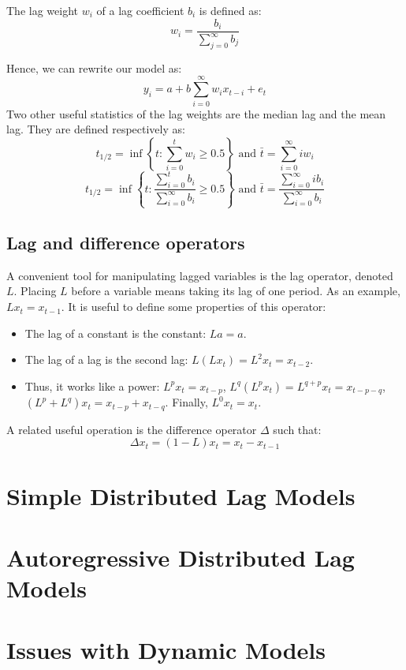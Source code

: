 \begin{definition}
The lag weight $w_i$ of a lag coefficient $b_i$ is defined as: $$w_i = \frac{b_i}{\sum_{j=0}^{\infty} b_j} $$
\end{definition}

Hence, we can rewrite our model as: $$y_i = a + b\sum_{i=0}^{\infty} w_i x_{t-i} + e_t $$ Two other useful statistics of the lag weights are the median lag and the mean lag. They are defined respectively as: $$t_{1/2} = \inf \left\lbrace t : \sum_{i=0}^{t} w_i \geq 0.5\right\rbrace \text{ and } \bar t = \sum_{i=0}^{\infty} iw_i $$ $$t_{1/2} = \inf \left\lbrace t : \frac{\sum_{i=0}^{t} b_i}{\sum_{i=0}^{\infty} b_i}  \geq 0.5\right\rbrace \text{ and } \bar t = \frac{\sum_{i=0}^{\infty} ib_i}{\sum_{i=0}^{\infty} b_i} $$ 

\subsection{Lag and difference operators}

A convenient tool for manipulating lagged variables is the lag operator, denoted $L$. Placing $L$ before a variable means taking its lag of one period. As an example, $Lx_t = x_{t-1}$. It is useful to define some properties of this operator:\begin{itemize}
\item The lag of a constant is the constant: $La = a$.
\item The lag of a lag is the second lag: $L(Lx_t) = L^2 x_t = x_{t-2}$.
\item Thus, it works like a power: $L^px_t = x_{t-p}$, $L^q(L^px_t) = L^{q+p}x_t = x_{t-p-q}$, $(L^p + L^q)x_t = x_{t-p} + x_{t-q}$. Finally, $L^0 x_t = x_t$.
\end{itemize}

A related useful operation is the difference operator $\Delta$ such that: $$\Delta x_t = (1 - L)x_t = x_t - x_{t-1}$$


\section{Simple Distributed Lag Models}



\section{Autoregressive Distributed Lag Models}



\section{Issues with Dynamic Models}





